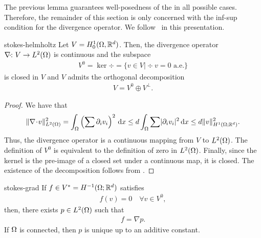 \begin{intro}
  The previous lemma guarantees well-posedness of the
   in all possible cases. Therefore, the
  remainder of this section is only concerned with the inf-sup
  condition for the divergence operator. We
  follow~\cite{GiraultRaviart86} in this presentation.
\end{intro}

\begin{Lemma}{stokes-helmholtz}
  Let $V=H^1_0(\Omega,\mathbb R^d)$. Then, the divergence operator
  $\nabla\!\cdot\!\colon V \to L^2(\Omega)$ is continuous and the subspace
  \begin{gather*}
    V^0 = \ker \div
    = \bigl\{v\in V \big|
    \div v = 0 \text{ a.e.} \bigr\}
  \end{gather*}
  is closed in $V$ and $V$ admits the orthogonal decomposition
  \begin{gather*}
    V = V^0\oplus V^\perp.
  \end{gather*}
\end{Lemma}

\begin{proof}
  We have that
  \begin{gather*}
    \lVert\nabla\!\cdot\! v\rVert_{L^2(\Omega)}^2
    = \int_\Omega \left(\sum \partial_iv_i\right)^2\,\mathrm{d} x
    \le d \int_\Omega \sum \lvert\partial_iv_i\rvert^2\,\mathrm{d} x
    \le d \lVert v\rVert_{H^1(\Omega;\mathbb R^d)}^2.
  \end{gather*}
  Thus, the divergence operator is a continuous mapping from $V$ to
  $L^2(\Omega)$. The definition of $V^0$ is equivalent to the
  definition of zero in $L^2(\Omega)$. Finally, since the kernel is
  the pre-image of a closed set under a continuous map, it is
  closed. The existence of the decomposition follows from
  .
\end{proof}

\begin{Lemma}{stokes-grad}
  If $f\in V^* = H^{-1}(\Omega;\mathbb R^d)$ satisfies
  \begin{gather*}
    f(v) = 0 \quad\forall v\in V^0,
  \end{gather*}
  then, there exists $p\in L^2(\Omega)$ such that
  \begin{gather*}
    f = \nabla p.
  \end{gather*}
  If $\Omega$ is connected, then $p$ is unique up to an additive
  constant.
\end{Lemma}

